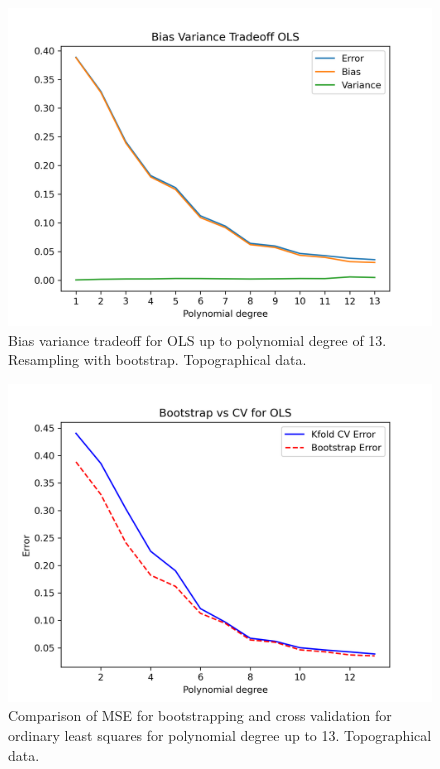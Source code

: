\documentclass{article}
\begin{document}
\begin{figure}[htbp]
    \centering
    \includegraphics[width=\textwidth*2/3]{Project1/figures/Terrain/Bias_Variance_Tradeoff_OLS_13.png}
    \caption{Bias variance tradeoff for OLS up to polynomial degree of 13. Resampling with bootstrap. Topographical data.}
    \label{fig:TerrainBVtradeoff}
\end{figure}

\begin{figure}[htbp]
    \centering
    \includegraphics[width=\textwidth*2/3]{Project1/figures/Terrain/Bias_vs_Var_OLS_13.png}
    \caption{Comparison of MSE for bootstrapping and cross validation for ordinary least squares for polynomial degree up to 13. Topographical data.}
    \label{fig:TerrainBvsCV}
\end{figure}
\end{document}
